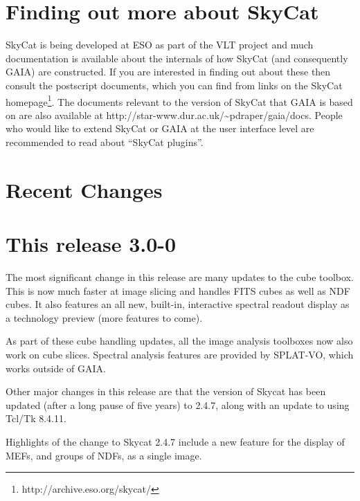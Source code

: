 \documentclass[twoside,11pt]{article}
\newcommand{\htmladdnormallinkfoot}[2]{#1\footnote{#2}}
\newcommand{\htmladdnormallink}[2]{#1}
\newcommand{\xlabel}[1]{}
\renewcommand{\_}{\texttt{\symbol{95}}}
\begin{document}
\section{\xlabel{finding_out_more_about_skycat}Finding out more about SkyCat}
\htmladdnormallink{SkyCat}{http://archive.eso.org/skycat/} is being
developed at \htmladdnormallink{ESO}{http://www.eso.org/} as part of
the \htmladdnormallink{VLT}{http://www.eso.org/vlt/} project and much
documentation is available about the internals of how SkyCat (and
consequently GAIA) are constructed. If you are interested in finding
out about these then consult the postscript documents, which you can
find from links on the \htmladdnormallinkfoot{SkyCat
homepage}{http://archive.eso.org/skycat/}. The documents relevant to
the version of SkyCat that GAIA is based on are also available at
\htmladdnormallink{http://star-www.dur.ac.uk/\~{}pdraper/gaia/docs}
{http://star-www.dur.ac.uk/~pdraper/gaia/docs}. People who would like
to extend SkyCat or GAIA at the user interface level are recommended
to read about ``SkyCat plugins''.

\section{Recent \xlabel{changes}Changes}

\section{This release 3.0-0}

The most significant change in this release are many updates to the cube
toolbox. This is now much faster at image slicing and handles FITS cubes as
well as NDF cubes. It also features an all new, built-in, interactive spectral
readout display as a technology preview (more features to come).

As part of these cube handling updates, all the image analysis toolboxes now
also work on cube slices. Spectral analysis features are provided by SPLAT-VO,
which works outside of GAIA.

Other major changes in this release are that the version of Skycat has been
updated (after a long pause of five years) to 2.4.7, along with an update to
using Tcl/Tk 8.4.11.

Highlights of the change to Skycat 2.4.7 include a new feature for the display
of MEFs, and groups of NDFs, as a single image.
\end{document}
